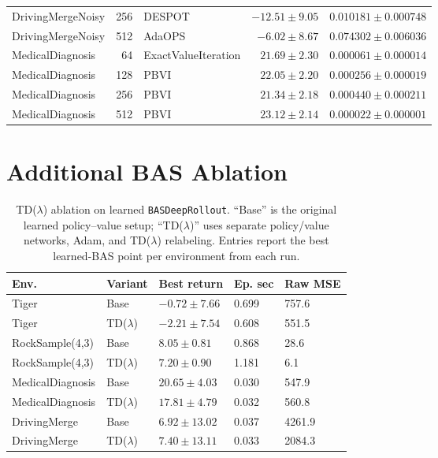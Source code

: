 \documentclass[10pt,twocolumn]{article}
\begin{document}
\begin{table}[t]
\begin{tabular}{l r l r r}
DrivingMergeNoisy & 256 & DESPOT & $-12.51\pm9.05$ & $0.010181\pm0.000748$ \\
DrivingMergeNoisy & 512 & AdaOPS & $-6.02\pm8.67$ & $0.074302\pm0.006036$ \\
\midrule
MedicalDiagnosis & 64 & ExactValueIteration & $21.69\pm2.30$ & $0.000061\pm0.000014$ \\
MedicalDiagnosis & 128 & PBVI & $22.05\pm2.20$ & $0.000256\pm0.000019$ \\
MedicalDiagnosis & 256 & PBVI & $21.34\pm2.18$ & $0.000440\pm0.000211$ \\
MedicalDiagnosis & 512 & PBVI & $23.12\pm2.14$ & $0.000022\pm0.000001$ \\
\bottomrule
\end{tabular}
\end{table}

\section{Additional BAS Ablation}

\begin{table}[t]
\centering
\caption{TD($\lambda$) ablation on learned \texttt{BASDeepRollout}. ``Base'' is the original learned policy--value setup; ``TD($\lambda$)'' uses separate policy/value networks, Adam, and TD($\lambda$) relabeling. Entries report the best learned-BAS point per environment from each run.}
\label{tab:tdlambda}
\scriptsize
\begin{tabular}{@{}p{} p{} p{} p{} p{}@{}}
\toprule
Env. & Variant & Best return & Ep. sec & Raw MSE \\
\midrule
Tiger & Base & $-0.72\pm7.66$ & 0.699 & 757.6 \\
Tiger & TD($\lambda$) & $-2.21\pm7.54$ & 0.608 & 551.5 \\
RockSample\allowbreak(4,3) & Base & $8.05\pm0.81$ & 0.868 & 28.6 \\
RockSample\allowbreak(4,3) & TD($\lambda$) & $7.20\pm0.90$ & 1.181 & 6.1 \\
Medical\allowbreak Diagnosis & Base & $20.65\pm4.03$ & 0.030 & 547.9 \\
Medical\allowbreak Diagnosis & TD($\lambda$) & $17.81\pm4.79$ & 0.032 & 560.8 \\
DrivingMerge & Base & $6.92\pm13.02$ & 0.037 & 4261.9 \\
DrivingMerge & TD($\lambda$) & $7.40\pm13.11$ & 0.033 & 2084.3 \\
\bottomrule
\end{tabular}
\end{table}



\end{document}
